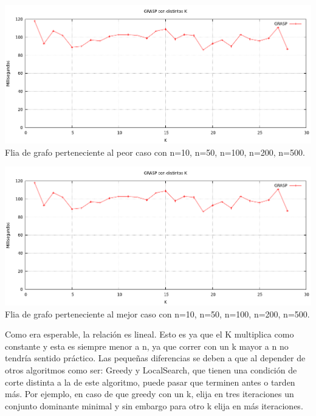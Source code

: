 \begin{center}
\includegraphics[width=15cm]{./graficos/GRASP_distintosK.png}\\
Flia de grafo perteneciente al peor caso con n=10, n=50, n=100, n=200, n=500.
\end{center}

\begin{center}
\includegraphics[width=15cm]{./graficos/GRASP_distintosK.png}\\
Flia de grafo perteneciente al mejor caso con n=10, n=50, n=100, n=200, n=500.
\end{center}


Como era esperable, la relación es lineal. Esto es ya que el K multiplica como constante y esta es siempre menor a n, ya que correr con un k mayor a n no tendría sentido práctico. Las pequeñas diferencias se deben a que al depender de otros algoritmos como ser: Greedy y LocalSearch, que tienen una condición de corte distinta a la de este algoritmo, puede pasar que terminen antes o tarden más. Por ejemplo, en caso de que greedy con un k, elija en tres iteraciones un conjunto dominante minimal y sin embargo para otro k elija en más iteraciones.








